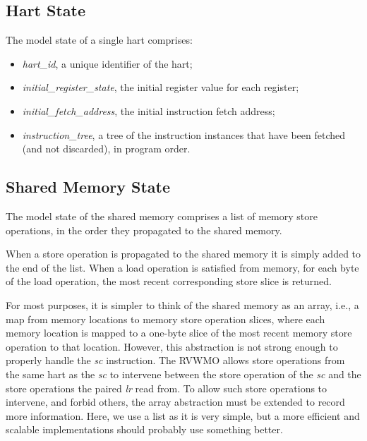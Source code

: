 \subsection{Hart State}
The model state of a single hart comprises:
\begin{itemize}
\item {\it hart\_id}, a unique identifier of the hart;
\item {\it initial\_register\_state}, the initial register value for each register;
\item {\it initial\_fetch\_address}, the initial instruction fetch address;
\item {\it instruction\_tree}, a tree of the instruction instances that have been fetched (and not discarded), in program order.
\end{itemize}


\subsection{Shared Memory State}
The model state of the shared memory comprises a list of memory store operations, in the order they propagated to the shared memory.

When a store operation is propagated to the shared memory it is simply added to the end of the list.
When a load operation is satisfied from memory, for each byte of the load operation, the most recent corresponding store slice is returned.

\begin{commentary}
For most purposes, it is simpler to think of the shared memory as an array, i.e., a map from memory locations to memory store operation slices, where each memory location is mapped to a one-byte slice of the most recent memory store operation to that location.
However, this abstraction is not strong enough to properly handle the {\em sc} instruction.
The RVWMO  allows store operations from the same hart as the {\em sc} to intervene between the store operation of the {\em sc} and the store operations the paired {\em lr} read from.
To allow such store operations to intervene, and forbid others, the array abstraction must be extended to record more information.
Here, we use a list as it is very simple, but a more efficient and scalable implementations should probably use something better.
\end{commentary}


